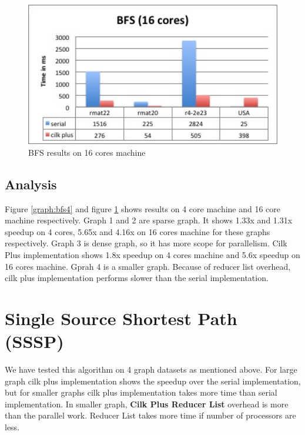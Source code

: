 \documentclass{article}
\begin{document}
\begin{figure}
   \centering
   \includegraphics[width=7.0in]{bfs16}
   \caption{BFS results on 16 cores machine}
   \label{graph:bfs16}
\end{figure}



\subsection{Analysis}
Figure \ref{graph:bfs4} and figure \ref{graph:bfs16} shows results on 4 core machine and 16 core machine respectively. Graph 1 and 2 are sparse graph. It shows 1.33x and 1.31x speedup on 4 cores, 5.65x and 4.16x on 16 cores machine for these graphs respectively. Graph 3 is dense graph, so it has more scope for parallelism. Cilk Plus implementation shows 1.8x speedup on 4 cores machine and 5.6x speedup on 16 cores machine. Gprah 4 is a smaller graph. Because of reducer list overhead, cilk plus implementation performs slower than the serial implementation. 


\section{Single Source Shortest Path (SSSP)}
We have tested this algorithm on 4 graph datasets as mentioned above. For large graph cilk plus implementation shows the speedup over the serial implementation, but for smaller graphs cilk plus implementation takes more time than serial implementation. In smaller graph, \textbf{Cilk Plus Reducer List} overhead is more than the parallel work. Reducer List takes more time if number of processors are less. \\
\end{document}
